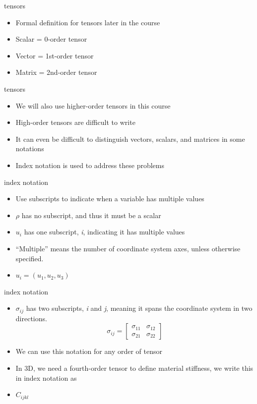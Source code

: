 \documentclass[
  letterpaper,
  ignorenonframetext,
  aspectratio=43,
  handout,
  12pt]{beamer}
\providecommand{\tightlist}{%
  \setlength{\itemsep}{0pt}\setlength{\parskip}{0pt}}
\providecommand{\tightlist}{%
\setlength{\itemsep}{0pt}\setlength{\parskip}{0pt}}
\begin{document}
\begin{frame}{tensors}
\protect\hypertarget{tensors}{}
\begin{itemize}
\tightlist
\item
  Formal definition for tensors later in the course
\item
  Scalar = 0-order tensor
\item
  Vector = 1st-order tensor
\item
  Matrix = 2nd-order tensor
\end{itemize}
\end{frame}

\begin{frame}{tensors}
\protect\hypertarget{tensors-1}{}
\begin{itemize}
\tightlist
\item
  We will also use higher-order tensors in this course
\item
  High-order tensors are difficult to write
\item
  It can even be difficult to distinguish vectors, scalars, and matrices
  in some notations
\item
  Index notation is used to address these problems
\end{itemize}
\end{frame}

\begin{frame}{index notation}
\protect\hypertarget{index-notation}{}
\begin{itemize}
\tightlist
\item
  Use subscripts to indicate when a variable has multiple values
\item
  \(\rho\) has no subscript, and thus it must be a scalar
\item
  \(u_i\) has one subscript, \emph{i}, indicating it has multiple values
\item
  ``Multiple'' means the number of coordinate system axes, unless
  otherwise specified.
\item
  \(u_i = (u_1, u_2, u_3)\)
\end{itemize}
\end{frame}

\begin{frame}{index notation}
\protect\hypertarget{index-notation-1}{}
\begin{itemize}
\item
  \(\sigma_{ij}\) has two subscripts, \emph{i} and \emph{j}, meaning it
  spans the coordinate system in two directions.
  \[\sigma_{ij} = \begin{bmatrix}
  \sigma_{11} & \sigma_{12}\\
  \sigma_{21} & \sigma_{22}
   \end{bmatrix}\]
\item
  We can use this notation for any order of tensor
\item
  In 3D, we need a fourth-order tensor to define material stiffness, we
  write this in index notation as
\item
  \(C_{ijkl}\)
\end{itemize}
\end{frame}
\end{document}
